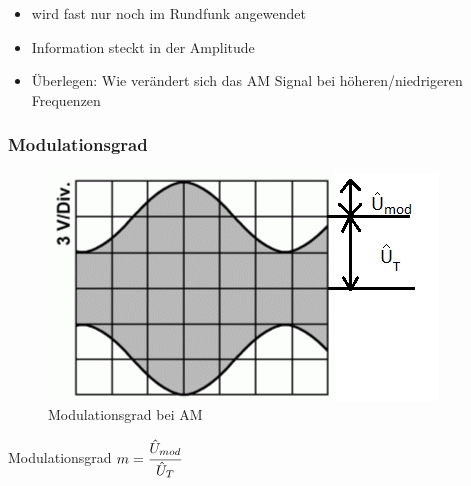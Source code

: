 \begin{frame}
\begin{minipage}{0.3\textwidth}
\begin{figure}
    \end{figure}
  \end{minipage}
  \hspace{0.5cm}
  \begin{minipage}{0.5\textwidth}
    \begin{itemize}
      \item wird fast nur noch im Rundfunk angewendet
      \item Information steckt in der Amplitude
      \item Überlegen: Wie verändert sich das AM Signal bei höheren/niedrigeren Frequenzen
    \end{itemize}
  \end{minipage}
\end{frame}

\begin{frame}
  \frametitle{Modulationsgrad}
  \begin{center}
    \begin{figure}
      \includegraphics[width=\textwidth,height=.75\textheight,keepaspectratio]{e14/TE103.png}
      \caption{Modulationsgrad bei AM}
    \end{figure}

    \hspace{0.5cm}

    \begin{block}{Modulationsgrad}
      $m = \cfrac{\hat{U}_{mod}}{\hat{U}_T}$
    \end{block}
  \end{center}
\end{frame}

